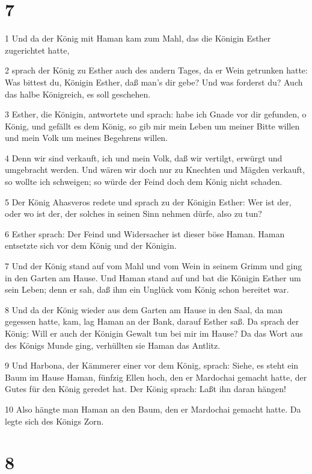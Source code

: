 \chapter{7}

\par 1 Und da der König mit Haman kam zum Mahl, das die Königin Esther zugerichtet hatte,
\par 2 sprach der König zu Esther auch des andern Tages, da er Wein getrunken hatte: Was bittest du, Königin Esther, daß man's dir gebe? Und was forderst du? Auch das halbe Königreich, es soll geschehen.
\par 3 Esther, die Königin, antwortete und sprach: habe ich Gnade vor dir gefunden, o König, und gefällt es dem König, so gib mir mein Leben um meiner Bitte willen und mein Volk um meines Begehrens willen.
\par 4 Denn wir sind verkauft, ich und mein Volk, daß wir vertilgt, erwürgt und umgebracht werden. Und wären wir doch nur zu Knechten und Mägden verkauft, so wollte ich schweigen; so würde der Feind doch dem König nicht schaden.
\par 5 Der König Ahasveros redete und sprach zu der Königin Esther: Wer ist der, oder wo ist der, der solches in seinen Sinn nehmen dürfe, also zu tun?
\par 6 Esther sprach: Der Feind und Widersacher ist dieser böse Haman. Haman entsetzte sich vor dem König und der Königin.
\par 7 Und der König stand auf vom Mahl und vom Wein in seinem Grimm und ging in den Garten am Hause. Und Haman stand auf und bat die Königin Esther um sein Leben; denn er sah, daß ihm ein Unglück vom König schon bereitet war.
\par 8 Und da der König wieder aus dem Garten am Hause in den Saal, da man gegessen hatte, kam, lag Haman an der Bank, darauf Esther saß. Da sprach der König: Will er auch der Königin Gewalt tun bei mir im Hause? Da das Wort aus des Königs Munde ging, verhüllten sie Haman das Antlitz.
\par 9 Und Harbona, der Kämmerer einer vor dem König, sprach: Siehe, es steht ein Baum im Hause Haman, fünfzig Ellen hoch, den er Mardochai gemacht hatte, der Gutes für den König geredet hat. Der König sprach: Laßt ihn daran hängen!
\par 10 Also hängte man Haman an den Baum, den er Mardochai gemacht hatte. Da legte sich des Königs Zorn.

\chapter{8}


